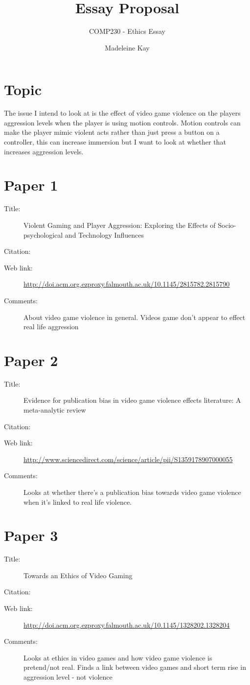 \documentclass{scrartcl}
\title{Essay Proposal}
\subtitle{COMP230 - Ethics Essay}
\author{Madeleine Kay}
\begin{document}
\maketitle

\section*{Topic}
The issue I intend to look at is the effect of video game violence on the players aggression levels when the player is using motion controls. Motion controls can make the player mimic violent acts rather than just press a button on a controller, this can increase immersion but I want to look at whether that increases aggression levels.



\section*{Paper 1}
\begin{description}
	\item[Title:] Violent Gaming and Player Aggression: Exploring the Effects of Socio-psychological and Technology Influences
	\item[Citation:] \cite{Fumhe}
	\item[Web link:] \url{http://doi.acm.org.ezproxy.falmouth.ac.uk/10.1145/2815782.2815790}
	\item[Comments:] About video game violence in general. Videos game don't appear to effect real life aggression
\end{description}


\section*{Paper 2}
\begin{description}
	\item[Title:] Evidence for publication bias in video game violence effects literature: A meta-analytic review
	\item[Citation:] \cite{Ferguson}
	\item[Web link:] \url{http://www.sciencedirect.com/science/article/pii/S1359178907000055}
	\item[Comments:] Looks at whether there's a publication bias towards video game violence when it's linked to real life violence.
\end{description}

\section*{Paper 3}
\begin{description}
	\item[Title:] Towards an Ethics of Video Gaming
	\item[Citation:] \cite{Tavinor}
	\item[Web link:] \url{http://doi.acm.org.ezproxy.falmouth.ac.uk/10.1145/1328202.1328204}
	\item[Comments:] Looks at ethics in video games and how video game violence is pretend/not real. Finds a link between video games and short term rise in aggression level - not violence 
\end{description}
\end{document}
